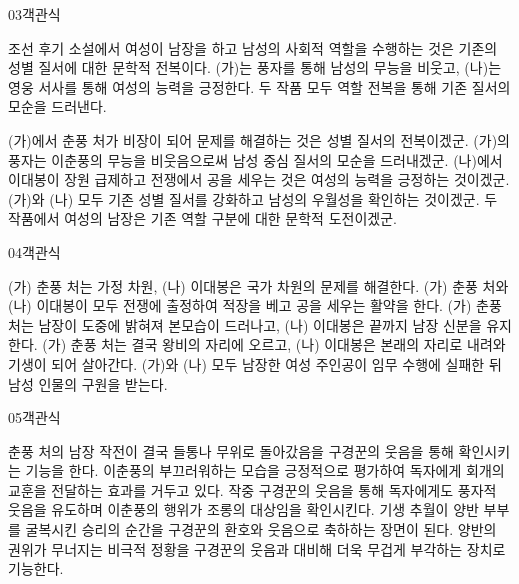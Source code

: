 \documentclass[fs85,seriesWit]{korfarm-base}
\begin{document}
\begin{kfQBlock}{03}{객관식}
\begin{kfEvidence}조선 후기 소설에서 여성이 남장을 하고 남성의 사회적 역할을 수행하는 것은 기존의 성별 질서에 대한 문학적 전복이다. (가)는 풍자를 통해 남성의 무능을 비웃고, (나)는 영웅 서사를 통해 여성의 능력을 긍정한다. 두 작품 모두 역할 전복을 통해 기존 질서의 모순을 드러낸다.\end{kfEvidence}
\begin{kfChoices}
\kfChoice (가)에서 춘풍 처가 비장이 되어 문제를 해결하는 것은 성별 질서의 전복이겠군.
\kfChoice (가)의 풍자는 이춘풍의 무능을 비웃음으로써 남성 중심 질서의 모순을 드러내겠군.
\kfChoice (나)에서 이대봉이 장원 급제하고 전쟁에서 공을 세우는 것은 여성의 능력을 긍정하는 것이겠군.
\kfChoice (가)와 (나) 모두 기존 성별 질서를 강화하고 남성의 우월성을 확인하는 것이겠군.
\kfChoice 두 작품에서 여성의 남장은 기존 역할 구분에 대한 문학적 도전이겠군.
\end{kfChoices}
\end{kfQBlock}

\begin{kfQBlock}{04}{객관식}
\begin{kfChoices}
\kfChoice (가) 춘풍 처는 가정 차원, (나) 이대봉은 국가 차원의 문제를 해결한다.
\kfChoice (가) 춘풍 처와 (나) 이대봉이 모두 전쟁에 출정하여 적장을 베고 공을 세우는 활약을 한다.
\kfChoice (가) 춘풍 처는 남장이 도중에 밝혀져 본모습이 드러나고, (나) 이대봉은 끝까지 남장 신분을 유지한다.
\kfChoice (가) 춘풍 처는 결국 왕비의 자리에 오르고, (나) 이대봉은 본래의 자리로 내려와 기생이 되어 살아간다.
\kfChoice (가)와 (나) 모두 남장한 여성 주인공이 임무 수행에 실패한 뒤 남성 인물의 구원을 받는다.
\end{kfChoices}
\end{kfQBlock}

\begin{kfQBlock}{05}{객관식}
\begin{kfChoices}
\kfChoice 춘풍 처의 남장 작전이 결국 들통나 무위로 돌아갔음을 구경꾼의 웃음을 통해 확인시키는 기능을 한다.
\kfChoice 이춘풍의 부끄러워하는 모습을 긍정적으로 평가하여 독자에게 회개의 교훈을 전달하는 효과를 거두고 있다.
\kfChoice 작중 구경꾼의 웃음을 통해 독자에게도 풍자적 웃음을 유도하며 이춘풍의 행위가 조롱의 대상임을 확인시킨다.
\kfChoice 기생 추월이 양반 부부를 굴복시킨 승리의 순간을 구경꾼의 환호와 웃음으로 축하하는 장면이 된다.
\kfChoice 양반의 권위가 무너지는 비극적 정황을 구경꾼의 웃음과 대비해 더욱 무겁게 부각하는 장치로 기능한다.
\end{kfChoices}
\end{kfQBlock}
\end{document}
